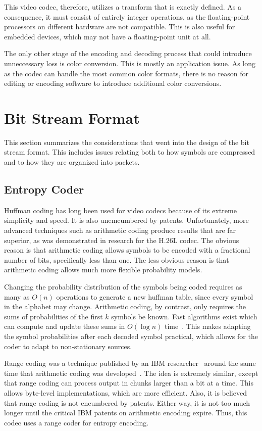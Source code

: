 \documentclass[11pt,letterpaper]{article}
\begin{document}
This video codec, therefore, utilizes a transform that is exactly defined.
As a consequence, it must consist of entirely integer operations, as the
 floating-point processors on different hardware are not compatible.
This is also useful for embedded devices, which may not have a floating-point
 unit at all.

The only other stage of the encoding and decoding process that could introduce
 unneccessary loss is color conversion.
This is mostly an application issue.
As long as the codec can handle the most common color formats, there is no
 reason for editing or encoding software to introduce additional color
 conversions.

\section{Bit Stream Format}

This section summarizes the considerations that went into the design of the
 bit stream format.
This includes issues relating both to how symbols are compressed and to how
 they are organized into packets.

\subsection{Entropy Coder}

Huffman coding has long been used for video codecs because of its extreme
 simplicity and speed.
It is also unemcumbered by patents.
Unfortunately, more advanced techniques such as arithmetic coding produce
 results that are far superior, as was demonstrated in research for the H.26L
 codec.
The obvious reason is that arithmetic coding allows symbols to be encoded with
 a fractional number of bits, specifically less than one.
The less obvious reason is that arithmetic coding allows much more flexible
 probability models.

Changing the probability distribution of the symbols being coded requires as
 many as $O(n)$ operations to generate a new huffman table, since every symbol
 in the alphabet may change.
Arithmetic coding, by contrast, only requires the sums of probabilities of
 the first $k$ symbols be known.
Fast algorithms exist which can compute and update these sums in $O(\log n)$
 time~\cite{Fen94,Fen95,Mof99}.
This makes adapting the symbol probabilities after each decoded symbol
 practical, which allows for the coder to adapt to non-stationary sources.

Range coding was a technique published by an IBM researcher~\cite{Mar79} around
 the same time that arithmetic coding was developed~\cite{Pas76}.
The idea is extremely similar, except that range coding can process output in
 chunks larger than a bit at a time.
This allows byte-level implementations, which are more efficient.
Also, it is believed that range coding is not encumbered by patents.
Either way, it is not too much longer until the critical IBM patents on
 arithmetic encoding expire.
Thus, this codec uses a range coder for entropy encoding.
\end{document}

